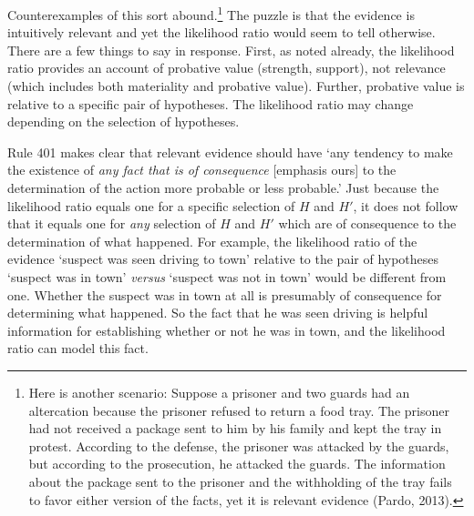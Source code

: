 \documentclass[
  10pt,
  dvipsnames,enabledeprecatedfontcommands]{scrartcl}
\begin{document}
\noindent  Counterexamples of this sort abound.\footnote{Here is another
  scenario: Suppose a prisoner and two guards had an altercation because
  the prisoner refused to return a food tray. The prisoner had not
  received a package sent to him by his family and kept the tray in
  protest. According to the defense, the prisoner was attacked by the
  guards, but according to the prosecution, he attacked the guards. The
  information about the package sent to the prisoner and the withholding
  of the tray fails to favor either version of the facts, yet it is
  relevant evidence (Pardo, 2013).} The puzzle is that the evidence is
intuitively relevant and yet the likelihood ratio would seem to tell
otherwise. There are a few things to say in response. First, as noted
already, the likelihood ratio provides an account of probative value
(strength, support), not relevance (which includes both materiality and
probative value). Further, probative value is relative to a specific
pair of hypotheses. The likelihood ratio may change depending on the
selection of hypotheses.

Rule 401 makes clear that relevant evidence should have `any tendency to
make the existence of \emph{any fact that is of consequence} {[}emphasis
ours{]} to the determination of the action more probable or less
probable.' Just because the likelihood ratio equals one for a specific
selection of \(H\) and \(H'\), it does not follow that it equals one for
\textit{any} selection of \(H\) and \(H'\) which are of consequence to
the determination of what happened. For example, the likelihood ratio of
the evidence `suspect was seen driving to town' relative to the pair of
hypotheses `suspect was in town' \textit{versus} `suspect was not in
town' would be different from one. Whether the suspect was in town at
all is presumably of consequence for determining what happened. So the
fact that he was seen driving is helpful information for establishing
whether or not he was in town, and the likelihood ratio can model this
fact.
\end{document}
